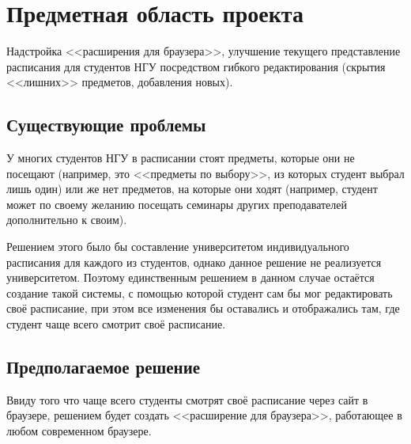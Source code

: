 \chapter{Предметная область проекта}
	\label{chapter2}

	Надстройка <<расширения для браузера>>, улучшение текущего представление расписания для студентов НГУ посредством гибкого редактирования (скрытия <<лишних>> предметов, добавления новых).

	\section{Существующие проблемы}
		У многих студентов НГУ в расписании стоят предметы, которые они не посещают (например, это <<предметы по выбору>>, из которых студент выбрал лишь один) или же нет предметов, на которые они ходят (например, студент может по своему желанию посещать семинары других преподавателей дополнительно к своим).

		Решением этого было бы составление университетом индивидуального расписания для каждого из студентов, однако данное решение не реализуется университетом. Поэтому единственным решением в данном случае остаётся создание такой системы, с помощью которой студент сам бы мог редактировать своё расписание, при этом все изменения бы оставались и отображались там, где студент чаще всего смотрит своё расписание. 
	\section{Предполагаемое решение}
		Ввиду того что чаще всего студенты смотрят своё расписание через сайт в браузере, решением будет создать <<расширение для браузера>>, работающее в любом современном браузере.
